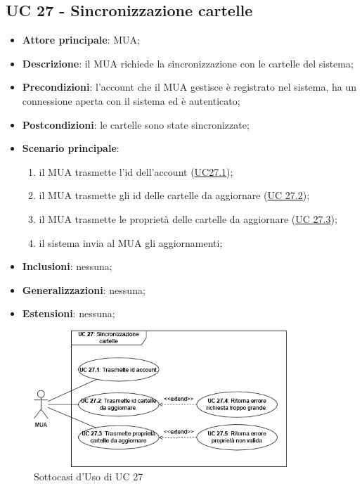 
\subsection{UC 27 - Sincronizzazione cartelle} \label{sec:UC27}
    
    \begin{itemize}
        \item \textbf{Attore principale}: MUA;
        \item \textbf{Descrizione}: il MUA richiede la sincronizzazione con le cartelle del sistema;
        \item \textbf{Precondizioni}: l’account che il MUA gestisce è registrato nel sistema, ha un connessione aperta con il sistema ed è autenticato;
        \item \textbf{Postcondizioni}: le cartelle sono state sincronizzate;
        \item \textbf{Scenario principale}:
            \begin{enumerate}
                \item il MUA trasmette l'id dell'account (\hyperref[sec:UC27.1]{UC27.1});
                \item il MUA trasmette gli id delle cartelle da aggiornare (\hyperref[sec:UC27.2]{UC 27.2});
                \item il MUA trasmette le proprietà delle cartelle da aggiornare (\hyperref[sec:UC27.3]{UC 27.3});
                \item il sistema invia al MUA gli aggiornamenti;
            \end{enumerate}
        \item \textbf{Inclusioni}: nessuna;
        \item \textbf{Generalizzazioni}: nessuna;
        \item \textbf{Estensioni}: nessuna;
    \end{itemize}

    \begin{figure}[H]
        \includegraphics[width=0.85\textwidth]{sections/uc_imgs/UC27.png}
        \centering
        \caption{Sottocasi d'Uso di UC 27}
    \end{figure}

